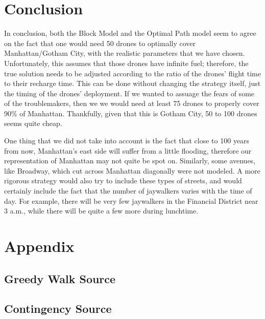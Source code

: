\documentclass{article}
\begin{document}
\section{Conclusion}
\label{sec:conclusion}
\par In conclusion, both the Block Model and the Optimal Path model seem to agree on the fact that one would need 50 drones to optimally cover Manhattan/Gotham City, with the realistic parameters that we have chosen. Unfortunately, this assumes that those drones have infinite fuel; therefore, the true solution needs to be adjusted according to the ratio of the drones' flight time to their recharge time. This can be done without changing the strategy itself, just the timing of the drones' deployment. If we wanted to assuage the fears of some of the troublemakers, then we we would need at least 75 drones to properly cover 90\% of Manhattan. Thankfully, given that this is Gotham City, 50 to 100 drones seems quite cheap.

\par One thing that we did not take into account is the fact that close to 100 years from now, Manhattan's east side will suffer from a little flooding, therefore our representation of Manhattan may not quite be spot on. Similarly, some avenues, like Broadway, which cut across Manhattan diagonally were not modeled. A more rigorous strategy would also try to include these types of streets, and would certainly include the fact that the number of jaywalkers varies with the time of day. For example, there will be very few jaywalkers in the Financial District near 3 a.m., while there will be quite a few more during lunchtime.

\section{Appendix}
\label{sec:appendix}

\subsection{Greedy Walk Source}
\label{sub:greedy_walk_source}



\subsection{Contingency Source}
\label{sub:contingency_source}

\end{document}
